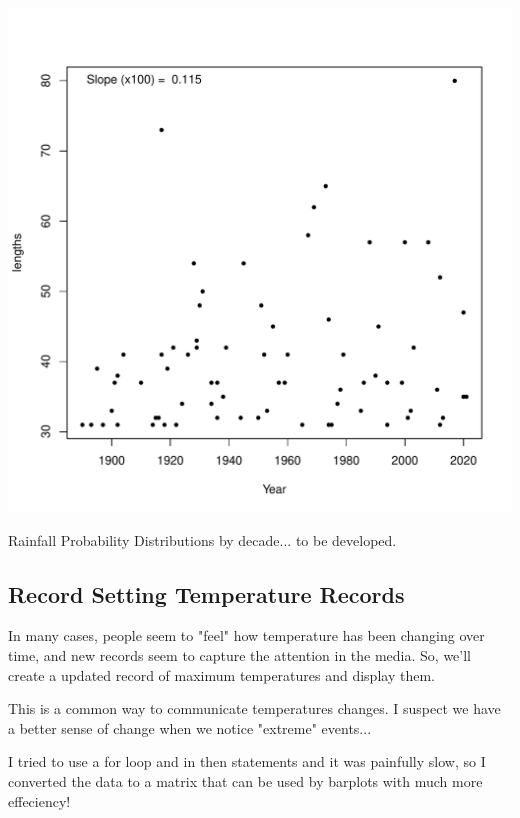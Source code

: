 \documentclass{article}
\begin{document}
\begin{knitrout}
\begin{kframe}
{\ttfamily\noindent\bfseries\color{errorcolor}{\#\# Error in is.data.frame(data): object 'Drought.run.100' not found}}\end{kframe}
\includegraphics[width=\maxwidth]{figure/unnamed-chunk-10-2} 
\end{knitrout}

Rainfall Probability Distributions by decade... to be developed.





\subsection{Record Setting Temperature Records}

In many cases, people seem to "feel" how temperature has been changing over time, and new records seem to capture the attention in the media. So, we'll create a updated record of maximum temperatures and display them. 





This is a common way to communicate temperatures changes. I suspect we have a better sense of change when we notice "extreme" events...






I tried to use a for loop and in then statements and it was painfully slow, so I converted the data to a matrix that can be used by barplots with much more effeciency!
\end{document}

